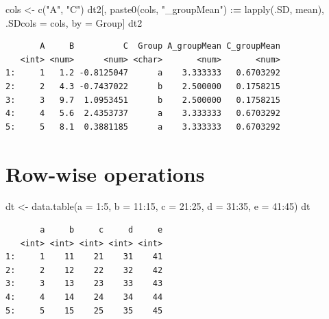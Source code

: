 \documentclass[
]{book}
\newenvironment{Shaded}{\begin{snugshade}}{\end{snugshade}}
\newcommand{\AttributeTok}[1]{\textcolor[rgb]{0.77,0.63,0.00}{#1}}
\newcommand{\DecValTok}[1]{\textcolor[rgb]{0.00,0.00,0.81}{#1}}
\newcommand{\ErrorTok}[1]{\textcolor[rgb]{0.64,0.00,0.00}{\textbf{#1}}}
\newcommand{\FunctionTok}[1]{\textcolor[rgb]{0.00,0.00,0.00}{#1}}
\newcommand{\NormalTok}[1]{#1}
\newcommand{\OtherTok}[1]{\textcolor[rgb]{0.56,0.35,0.01}{#1}}
\newcommand{\SpecialCharTok}[1]{\textcolor[rgb]{0.00,0.00,0.00}{#1}}
\newcommand{\StringTok}[1]{\textcolor[rgb]{0.31,0.60,0.02}{#1}}
\begin{document}
\begin{Shaded}
\begin{Highlighting}[]
\NormalTok{cols }\OtherTok{\textless{}{-}} \FunctionTok{c}\NormalTok{(}\StringTok{"A"}\NormalTok{, }\StringTok{"C"}\NormalTok{)}
\NormalTok{dt2[, }\FunctionTok{paste0}\NormalTok{(cols, }\StringTok{"\_groupMean"}\NormalTok{) }\SpecialCharTok{:}\ErrorTok{=} \FunctionTok{lapply}\NormalTok{(.SD, mean), .SDcols }\OtherTok{=}\NormalTok{ cols, by }\OtherTok{=}\NormalTok{ Group]}
\NormalTok{dt2}
\end{Highlighting}
\end{Shaded}

\begin{verbatim}
       A     B          C  Group A_groupMean C_groupMean
   <int> <num>      <num> <char>       <num>       <num>
1:     1   1.2 -0.8125047      a    3.333333   0.6703292
2:     2   4.3 -0.7437022      b    2.500000   0.1758215
3:     3   9.7  1.0953451      b    2.500000   0.1758215
4:     4   5.6  2.4353737      a    3.333333   0.6703292
5:     5   8.1  0.3881185      a    3.333333   0.6703292
\end{verbatim}

\hypertarget{row-wise-operations}{%
\section{Row-wise operations}\label{row-wise-operations}}

\begin{Shaded}
\begin{Highlighting}[]
\NormalTok{dt }\OtherTok{\textless{}{-}} \FunctionTok{data.table}\NormalTok{(}\AttributeTok{a =} \DecValTok{1}\SpecialCharTok{:}\DecValTok{5}\NormalTok{, }\AttributeTok{b =} \DecValTok{11}\SpecialCharTok{:}\DecValTok{15}\NormalTok{, }\AttributeTok{c =} \DecValTok{21}\SpecialCharTok{:}\DecValTok{25}\NormalTok{, }\AttributeTok{d =} \DecValTok{31}\SpecialCharTok{:}\DecValTok{35}\NormalTok{, }\AttributeTok{e =} \DecValTok{41}\SpecialCharTok{:}\DecValTok{45}\NormalTok{)}
\NormalTok{dt}
\end{Highlighting}
\end{Shaded}

\begin{verbatim}
       a     b     c     d     e
   <int> <int> <int> <int> <int>
1:     1    11    21    31    41
2:     2    12    22    32    42
3:     3    13    23    33    43
4:     4    14    24    34    44
5:     5    15    25    35    45
\end{verbatim}
\end{document}
